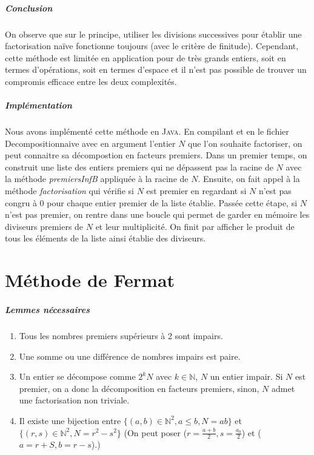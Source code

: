\documentclass[11pt,a4paper]{article}
\begin{document}
	\subparagraph{Conclusion}
	
	On observe que sur le principe, utiliser les divisions successives pour établir une factorisation naïve fonctionne toujours (avec le critère de finitude). Cependant, cette méthode est limitée en application pour de très grands entiers, soit en termes d'opérations, soit en termes d'espace et il n'est pas possible de trouver un compromis efficace entre les deux complexités.
	
	\subparagraph{Implémentation}
	Nous avons implémenté cette méthode en \textsc{Java}. En compilant et en le fichier Decompositionnaive avec en argument l'entier $N$ que l'on souhaite factoriser, on peut connaitre sa décompostion en facteurs premiers. Dans un premier temps, on construit une liste des entiers premiers qui ne dépassent pas la racine de $N$ avec la méthode \textit{premiersInfB} appliquée à la racine de $N$. Ensuite, on fait appel à la méthode \textit{factorisation} qui vérifie si $N$ est premier en regardant si $N$ n'est pas congru à 0 pour chaque entier premier de la liste établie. Passée cette étape, si $N$ n'est pas premier, on rentre dans une boucle qui permet de garder en mémoire les diviseurs premiers de $N$ et leur multiplicité. On finit par afficher le produit de tous les éléments de la liste ainsi établie des diviseurs.
	\newpage
	
	\section{\LARGE{Méthode de Fermat}}
	
	\subparagraph{Lemmes nécessaires}
	\begin{enumerate}
		\item Tous les nombres premiers supérieurs à 2 sont impairs.
		
		\item Une somme ou une différence de nombres impairs est paire.
		
		\item Un entier se décompose comme $2^{k}N$ avec $k \in \mathbb{N}$, $N$ un entier impair. Si $N$ est premier, on a donc la décomposition en facteurs premiers, sinon, $N$ admet une factorisation non triviale.
		
		\item Il existe une bijection entre ${\{(a,b) \in \mathbb{N}^2, a \leq b, N = ab\}}$ et $\{(r,s) \in \mathbb{N}^2, N = r^2 - s^2\}$ 
		(On peut poser ($r = \frac{a+b}{2}, s = \frac{a_b}{2}$) et ($a=r+S , b = r-s$).)
	\end{enumerate}
	
\end{document}

